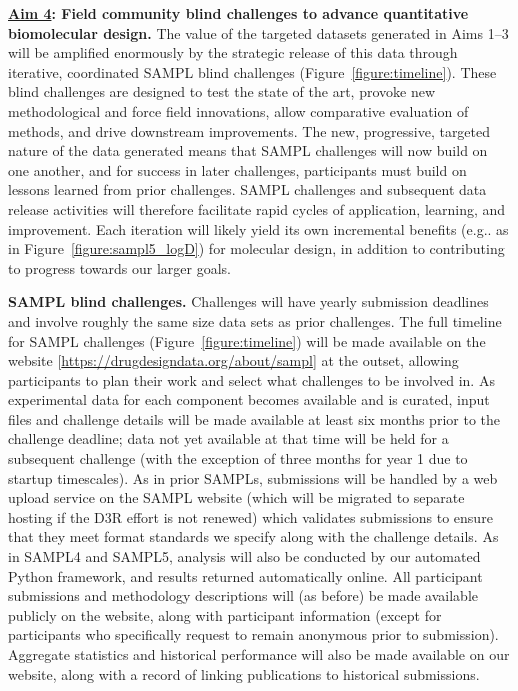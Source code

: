 \documentclass[11pt]{article}
\begin{document}
\eject

\textbf{\underline{Aim 4}: Field community blind challenges to advance quantitative biomolecular design.}
The value of the targeted datasets generated in Aims 1--3 will be amplified enormously by the strategic release of this data through iterative, coordinated SAMPL blind challenges (Figure~\ref{figure:timeline}).
These blind challenges are designed to test the state of the art, provoke new methodological and force field innovations, allow comparative evaluation of methods, and drive downstream improvements.
The new, progressive, targeted nature of the data generated means that SAMPL challenges will now build on one another, and for success in later challenges, participants must build on lessons learned from prior challenges.
SAMPL challenges and subsequent data release activities will therefore facilitate rapid cycles of application, learning, and improvement.
Each iteration will likely yield its own incremental benefits (e.g.. as in Figure~\ref{figure:sampl5_logD}) for molecular design, in addition to contributing to progress towards our larger goals.

{\bf SAMPL blind challenges.} Challenges will have yearly submission deadlines and involve roughly the same size data sets as prior challenges.
The full timeline for SAMPL challenges (Figure~\ref{figure:timeline}) will be made available on the website [\url{https://drugdesigndata.org/about/sampl}] at the outset, allowing participants to plan their work and select what challenges to be involved in.
As experimental data for each component becomes available and is curated, input files and challenge details will be made available at least six months prior to the challenge deadline; data not yet available at that time will be held for a subsequent challenge (with the exception of three months for year 1 due to startup timescales).
As in prior SAMPLs, submissions will be handled by a web upload service on the SAMPL website (which will be migrated to separate hosting if the D3R effort is not renewed) which validates submissions to ensure that they meet format standards we specify along with the challenge details. 
As in SAMPL4 and SAMPL5, analysis will also be conducted by our automated Python framework, and results returned automatically online.
All participant submissions and methodology descriptions will (as before) be made available publicly on the website, along with participant information (except for participants who specifically request to remain anonymous prior to submission).
Aggregate statistics and historical performance will also be made available on our website, along with a record of linking publications to historical submissions.
\end{document}
